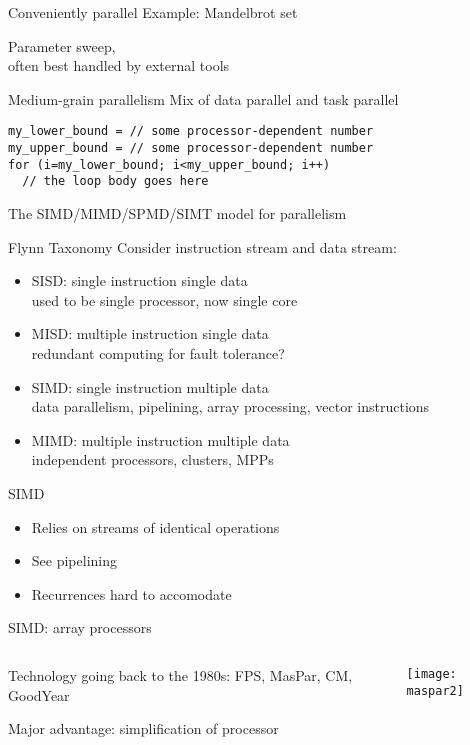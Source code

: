 \begin{numberedframe}{Conveniently parallel}
  Example: Mandelbrot set

  Parameter sweep,\\
  often best handled by external tools
\end{numberedframe}

\begin{numberedframe}{Medium-grain parallelism}
Mix of data parallel and task parallel
\begin{lstlisting}
my_lower_bound = // some processor-dependent number
my_upper_bound = // some processor-dependent number
for (i=my_lower_bound; i<my_upper_bound; i++)
  // the loop body goes here
\end{lstlisting}
\end{numberedframe}

 {The SIMD/MIMD/SPMD/SIMT model for parallelism}

\begin{numberedframe}{Flynn Taxonomy}
  Consider instruction stream and data stream:
  \begin{itemize}
  \item SISD: single instruction single data\\
    used to be single processor, now single core
  \item MISD: multiple instruction single data\\
    redundant computing for fault tolerance?
  \item SIMD: single instruction multiple data\\
    data parallelism, pipelining, array processing, vector instructions
  \item MIMD: multiple instruction multiple data\\
    independent processors, clusters, MPPs
  \end{itemize}
\end{numberedframe}

\begin{numberedframe}{SIMD}
  \begin{itemize}
  \item Relies on streams of identical operations
  \item See pipelining
  \item Recurrences hard to accomodate
  \end{itemize}
\end{numberedframe}

\begin{numberedframe}{SIMD: array processors}
  \begin{columns}
    \begin{column}{.5\textwidth}
      Technology going back to the 1980s: FPS, MasPar, CM, GoodYear

      Major advantage: simplification of processor
    \end{column}
    \begin{column}{.5\textwidth}
      \texttt{[image: maspar2]}
    \end{column}
  \end{columns}
\end{numberedframe}


